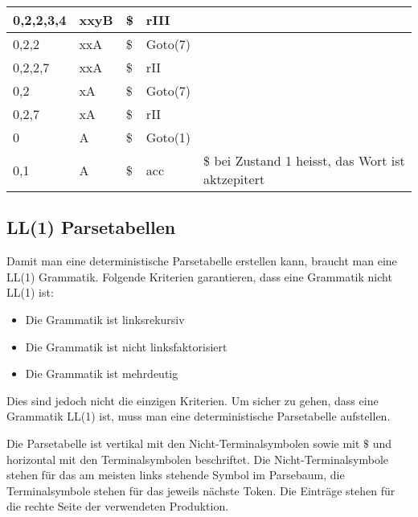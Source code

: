 \begin{table}[h]
\begin{tabular}{|l|l|l|l|p{7cm}|}
    0,2,2,3,4   & xxyB    & \$     & rIII    & ~                                                                                            \\ \hline
    0,2,2       & xxA     & \$     & Goto(7) & ~                                                                                            \\ \hline
    0,2,2,7     & xxA     & \$     & rII     & ~                                                                                            \\ \hline
    0,2         & xA      & \$     & Goto(7) & ~                                                                                            \\ \hline
    0,2,7       & xA      & \$     & rII     & ~                                                                                            \\ \hline
    0           & A       & \$     & Goto(1) & ~                                                                                            \\ \hline
    0,1         & A       & \$     & acc     & \$ bei Zustand 1 heisst, das Wort ist aktzepitert                                            \\ \hline
    \end{tabular}
\end{table}



\subsection{LL(1) Parsetabellen}

Damit man eine deterministische Parsetabelle erstellen kann, braucht man eine
LL(1) Grammatik. Folgende Kriterien garantieren, dass eine Grammatik nicht LL(1)
ist:

\begin{itemize}
	\item Die Grammatik ist linksrekursiv
	\item Die Grammatik ist nicht linksfaktorisiert
	\item Die Grammatik ist mehrdeutig
\end{itemize}

Dies sind jedoch nicht die einzigen Kriterien. Um sicher zu gehen, dass eine
Grammatik LL(1) ist, muss man eine deterministische Parsetabelle aufstellen.

Die Parsetabelle ist vertikal mit den Nicht-Terminalsymbolen sowie mit $\$$
und horizontal mit den Terminalsymbolen beschriftet. Die Nicht-Terminalsymbole stehen für das am meisten links stehende Symbol im Parsebaum, die Terminalsymbole stehen für das jeweils nächste Token. Die Einträge stehen für die rechte Seite der verwendeten Produktion.

